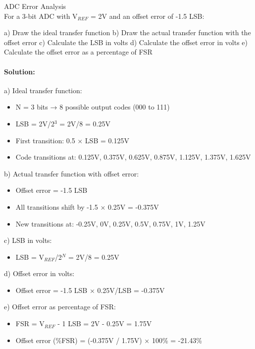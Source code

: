 \begin{example2}{ADC Error Analysis}\\
For a 3-bit ADC with V$_{REF}$ = 2V and an offset error of -1.5 LSB:

a) Draw the ideal transfer function
b) Draw the actual transfer function with the offset error
c) Calculate the LSB in volts
d) Calculate the offset error in volts
e) Calculate the offset error as a percentage of FSR

\tcblower
\paragraph{Solution:}
a) Ideal transfer function:
\begin{itemize}
    \item N = 3 bits → 8 possible output codes (000 to 111)
    \item LSB = 2V/2$^3$ = 2V/8 = 0.25V
    \item First transition: 0.5 × LSB = 0.125V
    \item Code transitions at: 0.125V, 0.375V, 0.625V, 0.875V, 1.125V, 1.375V, 1.625V
\end{itemize}

b) Actual transfer function with offset error:
\begin{itemize}
    \item Offset error = -1.5 LSB
    \item All transitions shift by -1.5 × 0.25V = -0.375V
    \item New transitions at: -0.25V, 0V, 0.25V, 0.5V, 0.75V, 1V, 1.25V
\end{itemize}

c) LSB in volts:
\begin{itemize}
    \item LSB = V$_{REF}$/2$^N$ = 2V/8 = 0.25V
\end{itemize}

d) Offset error in volts:
\begin{itemize}
    \item Offset error = -1.5 LSB × 0.25V/LSB = -0.375V
\end{itemize}

e) Offset error as percentage of FSR:
\begin{itemize}
    \item FSR = V$_{REF}$ - 1 LSB = 2V - 0.25V = 1.75V
    \item Offset error (\%FSR) = (-0.375V / 1.75V) × 100\% = -21.43\%
\end{itemize}
\end{example2}

